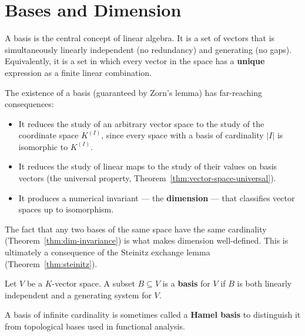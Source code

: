 
\newpage
\section{Bases and Dimension}

\begin{remark}
    A basis is the central concept of linear algebra. It is a set of vectors that is
    simultaneously linearly independent (no redundancy) and generating (no gaps). Equivalently,
    it is a set in which every vector in the space has a \textbf{unique} expression as a
    finite linear combination.

    The existence of a basis (guaranteed by Zorn's lemma) has far-reaching consequences:
    \begin{itemize}
        \item It reduces the study of an arbitrary vector space to the study of the
              coordinate space $K^{(I)}$, since every space with a basis of cardinality $|I|$
              is isomorphic to $K^{(I)}$.
        \item It reduces the study of linear maps to the study of their values on basis
              vectors (the universal property, Theorem~\ref{thm:vector-space-universal}).
        \item It produces a numerical invariant --- the \textbf{dimension} --- that classifies
              vector spaces up to isomorphism.
    \end{itemize}
    The fact that any two bases of the same space have the same cardinality
    (Theorem~\ref{thm:dim-invariance}) is what makes dimension well-defined.
    This is ultimately a consequence of the Steinitz exchange lemma
    (Theorem~\ref{thm:steinitz}).
\end{remark}

\begin{definition}[Basis]\label{def:basis}
    Let $V$ be a $K$-vector space. A subset $B \subseteq V$ is a \textbf{basis} for $V$ if
    $B$ is both linearly independent and a generating system for $V$.

    A basis of infinite cardinality is sometimes called a \textbf{Hamel basis} to distinguish
    it from topological bases used in functional analysis.
\end{definition}

